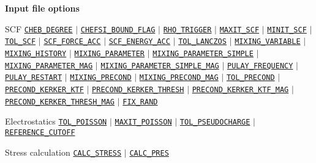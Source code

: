 \begin{frame}[allowframebreaks]{\textbf{Input file options}}
\begin{block}{SCF}
\hyperlink{CHEB_DEGREE}{\texttt{CHEB\_DEGREE}} $\vert$ \hyperlink{CHEFSI_BOUND_FLAG}{\texttt{CHEFSI\_BOUND\_FLAG}} $\vert$ \hyperlink{RHO_TRIGGER}{\texttt{RHO\_TRIGGER}} $\vert$ \hyperlink{MAXIT_SCF}{\texttt{MAXIT\_SCF}} $\vert$ \hyperlink{MINIT_SCF}{\texttt{MINIT\_SCF}} $\vert$ \hyperlink{TOL_SCF}{\texttt{TOL\_SCF}} $\vert$ \hyperlink{SCF_FORCE_ACC}{\texttt{SCF\_FORCE\_ACC}} $\vert$ \hyperlink{SCF_ENERGY_ACC}{\texttt{SCF\_ENERGY\_ACC}} $\vert$ \hyperlink{TOL_LANCZOS}{\texttt{TOL\_LANCZOS}} $\vert$ \hyperlink{MIXING_VARIABLE}{\texttt{MIXING\_VARIABLE}} $\vert$ \hyperlink{MIXING_HISTORY}{\texttt{MIXING\_HISTORY}} $\vert$ \hyperlink{MIXING_PARAMETER}{\texttt{MIXING\_PARAMETER}} $\vert$ \hyperlink{MIXING_PARAMETER_SIMPLE}{\texttt{MIXING\_PARAMETER\_SIMPLE}} $\vert$ \hyperlink{MIXING_PARAMETER_MAG}{\texttt{MIXING\_PARAMETER\_MAG}} $\vert$ \hyperlink{MIXING_PARAMETER_SIMPLE_MAG}{\texttt{MIXING\_PARAMETER\_SIMPLE\_MAG}} $\vert$ \hyperlink{PULAY_FREQUENCY}{\texttt{PULAY\_FREQUENCY}} $\vert$ \hyperlink{PULAY_RESTART}{\texttt{PULAY\_RESTART}} $\vert$ \hyperlink{MIXING_PRECOND}{\texttt{MIXING\_PRECOND}} $\vert$  \hyperlink{MIXING_PRECOND_MAG}{\texttt{MIXING\_PRECOND\_MAG}} $\vert$ \hyperlink{TOL_PRECOND}{\texttt{TOL\_PRECOND}} $\vert$ \hyperlink{PRECOND_KERKER_KTF}{\texttt{PRECOND\_KERKER\_KTF}} $\vert$ \hyperlink{PRECOND_KERKER_THRESH}{\texttt{PRECOND\_KERKER\_THRESH}} $\vert$ \hyperlink{PRECOND_KERKER_KTF_MAG}{\texttt{PRECOND\_KERKER\_KTF\_MAG}} $\vert$ \hyperlink{PRECOND_KERKER_THRESH_MAG}{\texttt{PRECOND\_KERKER\_THRESH\_MAG}} $\vert$ \hyperlink{FIX_RAND}{\texttt{FIX\_RAND}}
\end{block}

\vspace{-2mm}
\begin{block}{Electrostatics}
\hyperlink{TOL_POISSON}{\texttt{TOL\_POISSON}} $\vert$ \hyperlink{MAXIT_POISSON}{\texttt{MAXIT\_POISSON}} $\vert$ \hyperlink{TOL_PSEUDOCHARGE}{\texttt{TOL\_PSEUDOCHARGE}} $\vert$ \hyperlink{REFERENCE_CUTOFF}{\texttt{REFERENCE\_CUTOFF}} 
\end{block}

\vspace{-2mm}
\begin{block}{Stress calculation}
\hyperlink{CALC_STRESS}{\texttt{CALC\_STRESS}} $\vert$ \hyperlink{CALC_PRES}{\texttt{CALC\_PRES}}
\end{block}
\vspace{-2mm}


\end{frame}
